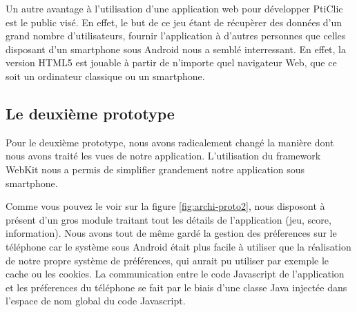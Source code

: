 \documentclass[a4paper,11pt,french]{article}
\def\android{Android\texttrademark{}}
\begin{document}
Un autre avantage à l'utilisation d'une application web pour développer PtiClic est le public visé. En effet, le
but de ce jeu étant de récupèrer des données d'un grand nombre d'utilisateurs, fournir l'application à d'autres personnes que celles
disposant d'un smartphone sous \android{} nous a semblé interressant. En effet, la version HTML5 est jouable à partir de n'importe quel navigateur Web, que ce soit un ordinateur classique ou un smartphone.


\subsection{Le deuxième prototype}
Pour le deuxième prototype, nous avons radicalement changé la manière dont nous avons traité les vues de notre application. L'utilisation du framework WebKit nous a permis de simplifier grandement notre application sous smartphone.

Comme vous pouvez le voir sur la figure \ref{fig:archi-proto2}, nous disposont à présent d'un gros module traitant tout les détails de l'application (jeu, score, information). Nous avons tout de même gardé la gestion des préferences sur le téléphone car le système sous \android{} était plus facile à utiliser que la réalisation de notre propre système de préférences, qui aurait pu utiliser par exemple le cache ou les cookies. %
La communication entre le code Javascript de l'application et les préferences du téléphone se fait par le biais d'une classe Java injectée dans l'espace de nom global du code Javascript.
\end{document}
